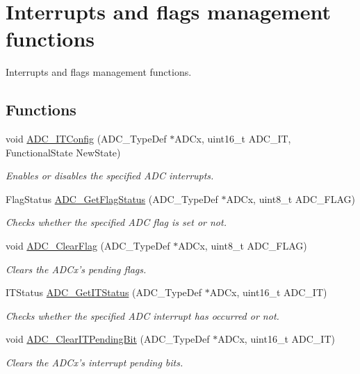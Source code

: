 \hypertarget{group___a_d_c___group7}{\section{Interrupts and flags management functions}
\label{group___a_d_c___group7}
}


Interrupts and flags management functions.  


\subsection*{Functions}
\begin{DoxyCompactItemize}
\item 
void \hyperlink{group___a_d_c___group7_gad4c84b54b539944f555488bf979f82b6}{A\-D\-C\-\_\-\-I\-T\-Config} (A\-D\-C\-\_\-\-Type\-Def $\ast$A\-D\-Cx, uint16\-\_\-t A\-D\-C\-\_\-\-I\-T, Functional\-State New\-State)
\begin{DoxyCompactList}\small\item\em Enables or disables the specified A\-D\-C interrupts. \end{DoxyCompactList}\item 
Flag\-Status \hyperlink{group___a_d_c___group7_gaa12546e51ec905c90a3aada432bd4633}{A\-D\-C\-\_\-\-Get\-Flag\-Status} (A\-D\-C\-\_\-\-Type\-Def $\ast$A\-D\-Cx, uint8\-\_\-t A\-D\-C\-\_\-\-F\-L\-A\-G)
\begin{DoxyCompactList}\small\item\em Checks whether the specified A\-D\-C flag is set or not. \end{DoxyCompactList}\item 
void \hyperlink{group___a_d_c___group7_gaf34f36798f811b4a41321ea2d12118d4}{A\-D\-C\-\_\-\-Clear\-Flag} (A\-D\-C\-\_\-\-Type\-Def $\ast$A\-D\-Cx, uint8\-\_\-t A\-D\-C\-\_\-\-F\-L\-A\-G)
\begin{DoxyCompactList}\small\item\em Clears the A\-D\-Cx's pending flags. \end{DoxyCompactList}\item 
I\-T\-Status \hyperlink{group___a_d_c___group7_gaa1d3b910a83dbf14d4f68c8eef058612}{A\-D\-C\-\_\-\-Get\-I\-T\-Status} (A\-D\-C\-\_\-\-Type\-Def $\ast$A\-D\-Cx, uint16\-\_\-t A\-D\-C\-\_\-\-I\-T)
\begin{DoxyCompactList}\small\item\em Checks whether the specified A\-D\-C interrupt has occurred or not. \end{DoxyCompactList}\item 
void \hyperlink{group___a_d_c___group7_ga601c6a67bd883eb631ecc7aa5e999b9c}{A\-D\-C\-\_\-\-Clear\-I\-T\-Pending\-Bit} (A\-D\-C\-\_\-\-Type\-Def $\ast$A\-D\-Cx, uint16\-\_\-t A\-D\-C\-\_\-\-I\-T)
\begin{DoxyCompactList}\small\item\em Clears the A\-D\-Cx's interrupt pending bits. \end{DoxyCompactList}\end{DoxyCompactItemize}


